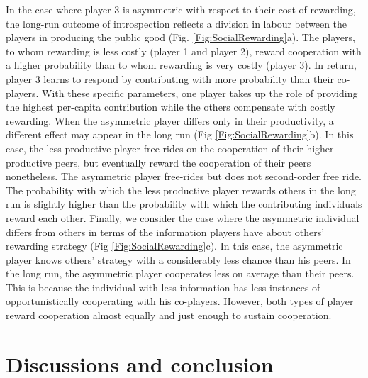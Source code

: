 \documentclass[11pt]{article}
\theoremstyle{plainCl1}
\theoremstyle{plainCl2}
\begin{document}
\noindent In the case where player 3 is asymmetric with respect to their cost of rewarding, the long-run outcome of introspection reflects a division in labour between the players in producing the public good (Fig. \ref{Fig:SocialRewarding}a). The players, to whom rewarding is less costly (player 1 and player 2), reward cooperation with a higher probability than to whom rewarding is very costly (player 3). In return, player 3 learns to respond by contributing with more probability than their co-players. With these specific parameters, one player takes up the role of providing the highest per-capita contribution while the others compensate with costly rewarding. When the asymmetric player differs only in their productivity, a different effect may appear in the long run (Fig \ref{Fig:SocialRewarding}b). In this case, the less productive player free-rides on the cooperation of their higher productive peers, but eventually reward the cooperation of their peers nonetheless. The asymmetric player free-rides but does not second-order free ride. The probability with which the less productive player rewards others in the long run is slightly higher than the probability with which the contributing individuals reward each other. Finally, we consider the case where the asymmetric individual differs from others in terms of the information players have about others' rewarding strategy (Fig \ref{Fig:SocialRewarding}c). In this case, the asymmetric player knows others' strategy with a considerably less chance than his peers. In the long run, the asymmetric player cooperates less on average than their peers. This is because the individual with less information has less instances of opportunistically cooperating with his co-players. However, both types of player reward cooperation almost equally and just enough to sustain cooperation. 

\section*{Discussions and conclusion}
\end{document}
